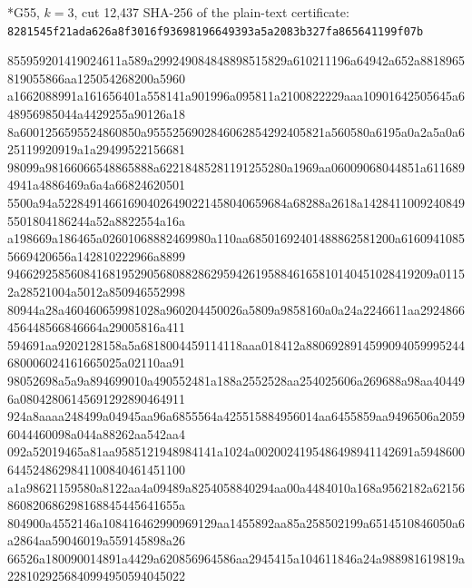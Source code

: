 \documentclass[10pt,letterpaper]{article}
\makeatletter
\renewcommand\subsection{\@startsection{subsection}{2}{0pt}{1.2ex plus .4ex minus .2ex}{.5ex plus .2ex}{\normalfont\normalsize\bfseries}}
\newenvironment{hexcertificate}{\par\begingroup\ttfamily\scriptsize\raggedright\setlength{\parskip}{0pt}\noindent}{\par\endgroup}
\makeatother
\begin{document}
\subsection*{G55, $k=3$, cut 12{,}437}
{\scriptsize SHA-256 of the plain-text certificate:}\\
{\scriptsize\texttt{8281545f21ada626a8f3016f93698196649393a5a2083b327fa865641199f07b}}
\begin{hexcertificate}
855959201419024611a589a299249084848898515829a610211196a64942a652a8818965819055866aa125054268200a5960\\
a1662088991a161656401a558141a901996a095811a2100822229aaa10901642505645a648956985044a4429255a90126a18\\
8a6001256595524860850a9555256902846062854292405821a560580a6195a0a2a5a0a625119920919a1a29499522156681\\
98099a98166066548865888a62218485281191255280a1969aa06009068044851a6116894941a4886469a6a4a66824620501\\
5500a94a522849146616904026490221458040659684a68288a2618a14284110092408495501804186244a52a8822554a16a\\
a198669a186465a02601068882469980a110aa68501692401488862581200a61609410855669420656a142810222966a8899\\
9466292585608416819529056808828629594261958846165810140451028419209a01152a28521004a5012a850946552998\\
80944a28a460460659981028a960204450026a5809a9858160a0a24a2246611aa2924866456448566846664a29005816a411\\
594691aa9202128158a5a6818004459114118aaa018412a8806928914599094059995244680006024161665025a02110aa91\\
98052698a5a9a894699010a490552481a188a2552528aa254025606a269688a98aa404496a08042806145691292890464911\\
924a8aaaa248499a04945aa96a6855564a425515884956014aa6455859aa9496506a20596044460098a044a88262aa542aa4\\
092a52019465a81aa9585121948984141a1024a0020024195486498941142691a59486006445248629841100840461451100\\
a1a98621159580a8122aa4a09489a8254058840294aa00a4484010a168a9562182a62156860820686298168845445641655a\\
804900a4552146a108416462990969129aa1455892aa85a258502199a6514510846050a6a2864aa59046019a559145898a26\\
66526a180090014891a4429a620856964586aa2945415a104611846a24a988981619819a2281029256840994950594045022\\

\end{hexcertificate}
\end{document}
